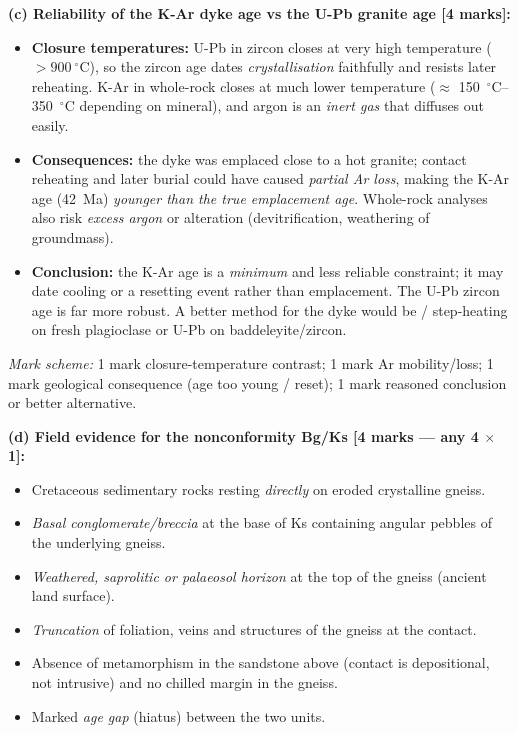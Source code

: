 \documentclass[11pt]{article}
\begin{document}
\begin{corrige}
\textbf{(c) Reliability of the K-Ar dyke age vs the U-Pb granite age [4 marks]:}
\begin{itemize}
\item \textbf{Closure temperatures:} U-Pb in zircon closes at very high temperature ($> \SI{900}{\ensuremath{{}^{\circ}\mathrm{C}}}$), so the zircon age dates \emph{crystallisation} faithfully and resists later reheating. K-Ar in whole-rock closes at much lower temperature ($\approx$ \SIrange{150}{350}{\ensuremath{{}^{\circ}\mathrm{C}}} depending on mineral), and argon is an \emph{inert gas} that diffuses out easily.
\item \textbf{Consequences:} the dyke was emplaced close to a hot granite; contact reheating and later burial could have caused \emph{partial Ar loss}, making the K-Ar age (\SI{42}{Ma}) \emph{younger than the true emplacement age}. Whole-rock analyses also risk \emph{excess argon} or alteration (devitrification, weathering of groundmass).
\item \textbf{Conclusion:} the K-Ar age is a \emph{minimum} and less reliable constraint; it may date cooling or a resetting event rather than emplacement. The U-Pb zircon age is far more robust. A better method for the dyke would be / step-heating on fresh plagioclase or U-Pb on baddeleyite/zircon.
\end{itemize}
\emph{Mark scheme:} 1 mark closure-temperature contrast; 1 mark Ar mobility/loss; 1 mark geological consequence (age too young / reset); 1 mark reasoned conclusion or better alternative.

\textbf{(d) Field evidence for the nonconformity Bg/Ks [4 marks — any 4 $\times$ 1]:}
\begin{itemize}
\item Cretaceous sedimentary rocks resting \emph{directly} on eroded crystalline gneiss.
\item \emph{Basal conglomerate/breccia} at the base of Ks containing angular pebbles of the underlying gneiss.
\item \emph{Weathered, saprolitic or palaeosol horizon} at the top of the gneiss (ancient land surface).
\item \emph{Truncation} of foliation, veins and structures of the gneiss at the contact.
\item Absence of metamorphism in the sandstone above (contact is depositional, not intrusive) and no chilled margin in the gneiss.
\item Marked \emph{age gap} (hiatus) between the two units.
\end{itemize}
\end{corrige}
\end{document}
